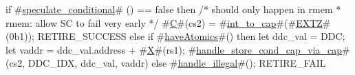if #\hyperref[sailRISCVzspeculatezyconditional]{speculate\_conditional}# () == false then {
  /* should only happen in rmem
   * rmem: allow SC to fail very early
   */
  #\hyperref[sailRISCVzC]{C}#(cs2) = #\hyperref[sailRISCVzintzytozycap]{int\_to\_cap}#(#\hyperref[sailRISCVzEXTZ]{EXTZ}#(0b1));
  RETIRE_SUCCESS
} else if #\hyperref[sailRISCVzhaveAtomics]{haveAtomics}#() then {
  let ddc_val = DDC;
  let vaddr = ddc_val.address + #\hyperref[sailRISCVzX]{X}#(rs1);
  #\hyperref[sailRISCVzhandlezystorezycondzycapzyviazycap]{handle\_store\_cond\_cap\_via\_cap}#(cs2, DDC_IDX, ddc_val, vaddr)
} else {
  #\hyperref[sailRISCVzhandlezyillegal]{handle\_illegal}#();
  RETIRE_FAIL
}
